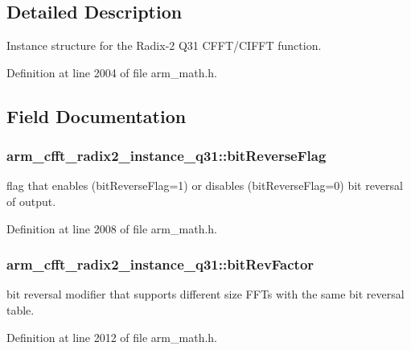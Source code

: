 \subsection{Detailed Description}
Instance structure for the Radix-\/2 Q31 C\-F\-F\-T/\-C\-I\-F\-F\-T function. 

Definition at line 2004 of file arm\-\_\-math.\-h.



\subsection{Field Documentation}
\hypertarget{structarm__cfft__radix2__instance__q31_a6239b8d268285334e88c008c07d68616}{
\subsubsection[{bit\-Reverse\-Flag}]{ arm\-\_\-cfft\-\_\-radix2\-\_\-instance\-\_\-q31\-::bit\-Reverse\-Flag}}\label{structarm__cfft__radix2__instance__q31_a6239b8d268285334e88c008c07d68616}
flag that enables (bit\-Reverse\-Flag=1) or disables (bit\-Reverse\-Flag=0) bit reversal of output. 

Definition at line 2008 of file arm\-\_\-math.\-h.

\hypertarget{structarm__cfft__radix2__instance__q31_a9d17a87263953fe3559a007512c9f3a4}{
\subsubsection[{bit\-Rev\-Factor}]{ arm\-\_\-cfft\-\_\-radix2\-\_\-instance\-\_\-q31\-::bit\-Rev\-Factor}}\label{structarm__cfft__radix2__instance__q31_a9d17a87263953fe3559a007512c9f3a4}
bit reversal modifier that supports different size F\-F\-Ts with the same bit reversal table. 

Definition at line 2012 of file arm\-\_\-math.\-h.

